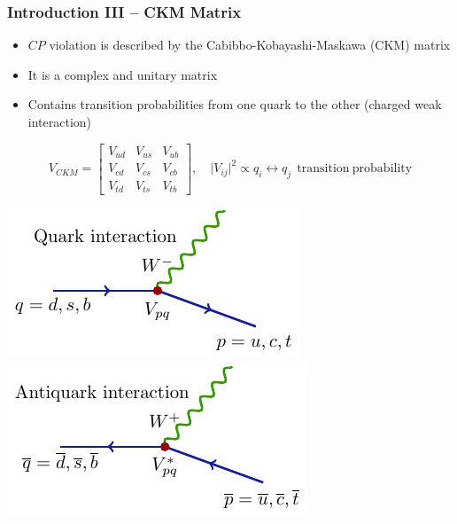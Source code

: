 \documentclass[serif]{beamer}
\begin{document}
\begin{frame}[t]
\frametitle{Introduction III -- CKM Matrix}
\small
\vspace{-3mm}
\begin{block}{}
	\begin{itemize}
		\item $CP$ violation is described by the Cabibbo-Kobayashi-Maskawa (CKM) matrix
		\item It is a complex and unitary matrix
		\item Contains transition probabilities from one quark to the other (charged weak interaction)

	\end{itemize}
	$$V_{CKM} = \begin{bmatrix} V_{ud} & V_{us} & V_{ub} \\ V_{cd} & V_{cs} & V_{cb} \\ V_{td} & V_{ts} & V_{tb} \end{bmatrix}, \quad \vert V_{ij}\vert^2 \propto q_i \leftrightarrow q_j~~\mathrm{transition~probability} $$
\end{block}

\begin{center}
	\includegraphics[scale=0.95]{texfig/quark_transition}
	\includegraphics[scale=0.95]{texfig/antiquark_transition}
\end{center}

\end{frame}

\end{document}
